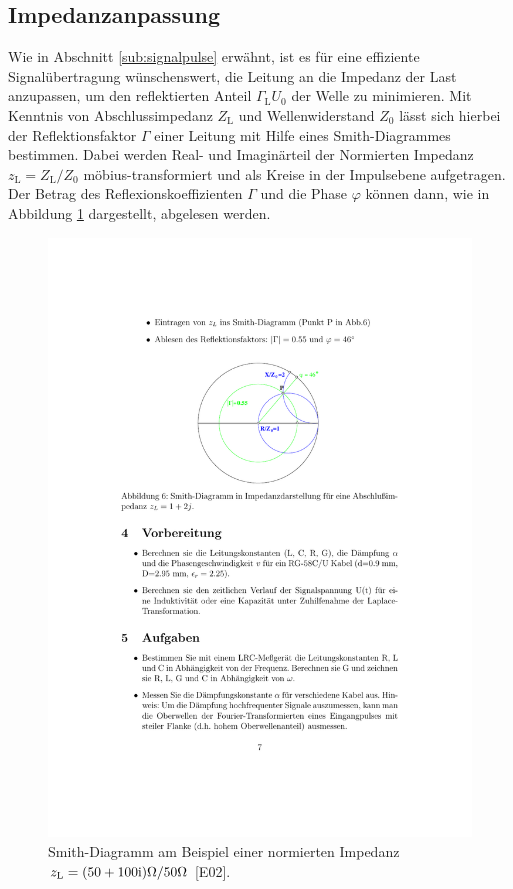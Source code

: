 \subsection{Impedanzanpassung} %
\label{sub:impedanzanpassung}
Wie in Abschnitt \ref{sub:signalpulse} erwähnt, ist es für eine effiziente
Signalübertragung wünschenswert, die Leitung an die Impedanz der Last
anzupassen, um den reflektierten Anteil $\Gamma_\text{L}U_0$ der Welle zu
minimieren.
Mit Kenntnis von Abschlussimpedanz $Z_\text{L}$ und Wellenwiderstand $Z_0$
lässt sich hierbei der Reflektionsfaktor $\Gamma$ einer Leitung mit Hilfe
eines Smith-Diagrammes bestimmen.
Dabei werden Real- und Imaginärteil der Normierten Impedanz
$z_\text{L} = Z_\text{L}/Z_0$ möbius-transformiert und als Kreise in der
Impulsebene aufgetragen.
Der Betrag des Reflexionskoeffizienten $\Gamma$ und die Phase $\varphi$ können
dann, wie in Abbildung \ref{fig:smith} dargestellt, abgelesen werden.
\begin{figure}
    \centering
    \includegraphics[width=0.7\linewidth]{img/smith.pdf}
    \caption{
        Smith-Diagramm am Beispiel einer normierten Impedanz
        $z_\text{L} = (\num{50}+\num{100}\mathrm{i})\si{\ohm}/\num{50}\si{\ohm}$
        [E02].
    }
    \label{fig:smith}
\end{figure}
